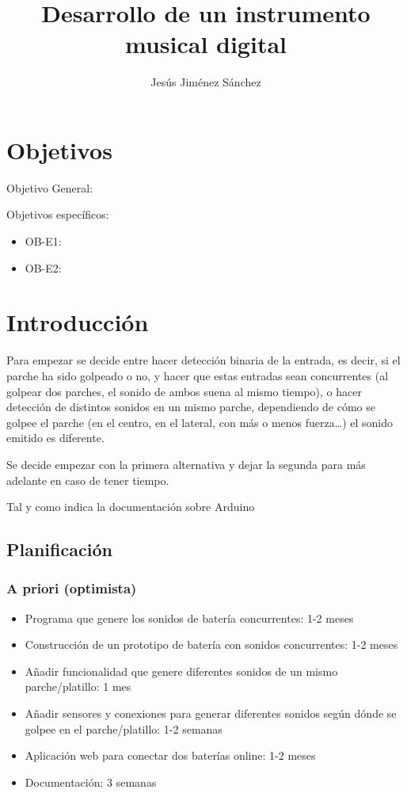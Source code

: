 \documentclass{article}
\title{Desarrollo de un instrumento musical digital}
\author{ Jesús Jiménez Sánchez }
\begin{document}
\maketitle

\section*{Objetivos}\label{sec:Objetivos}
Objetivo General: 

Objetivos específicos:
\begin{itemize}
    \item OB-E1:
    \item OB-E2:
\end{itemize}

\section{Introducción}\label{sec:Introduccion}
Para empezar se decide entre hacer detección binaria de la entrada, es decir, si el parche ha sido golpeado o no, y hacer que estas entradas sean concurrentes (al golpear dos parches, el sonido de ambos suena al mismo tiempo), o hacer detección de distintos sonidos en un mismo parche, dependiendo de cómo se golpee el parche (en el centro, en el lateral, con más o menos fuerza…) el sonido emitido es diferente.

Se decide empezar con la primera alternativa y dejar la segunda para más adelante en caso de tener tiempo.

Tal y como indica la documentación sobre Arduino \cite{DocArduino}

\subsection{Planificación}

 \subsubsection{A priori (optimista)}
 
 \begin{itemize}
    \item Programa que genere los sonidos de batería concurrentes: 1-2 meses
    \item Construcción de un prototipo de batería con sonidos concurrentes: 1-2 meses
    \item Añadir funcionalidad que genere diferentes sonidos de un mismo parche/platillo: 1 mes
    \item Añadir sensores y conexiones para generar diferentes sonidos según dónde se golpee en el parche/platillo: 1-2 semanas
    \item Aplicación web para conectar dos baterías online: 1-2 meses
    \item Documentación: 3 semanas
\end{itemize}
\end{document}
